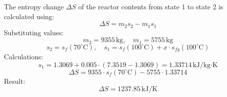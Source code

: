 The entropy change \( \Delta S \) of the reactor contents from state 1 to state 2 is calculated using:  
\[
\Delta S = m_2 s_2 - m_1 s_1
\]  
Substituting values:  
\[
m_2 = 9355 \, \text{kg}, \quad m_1 = 5755 \, \text{kg}
\]  
\[
s_2 = s_f(70^\circ\text{C}), \quad s_1 = s_f(100^\circ\text{C}) + x \cdot s_{fg}(100^\circ\text{C})
\]  
Calculations:  
\[
s_1 = 1.3069 + 0.005 \cdot (7.3519 - 1.3069) = 1.33714 \, \text{kJ/kg·K}
\]  
\[
\Delta S = 9355 \cdot s_f(70^\circ\text{C}) - 5755 \cdot 1.33714
\]  
Result:  
\[
\Delta S = 1237.85 \, \text{kJ/K}
\]